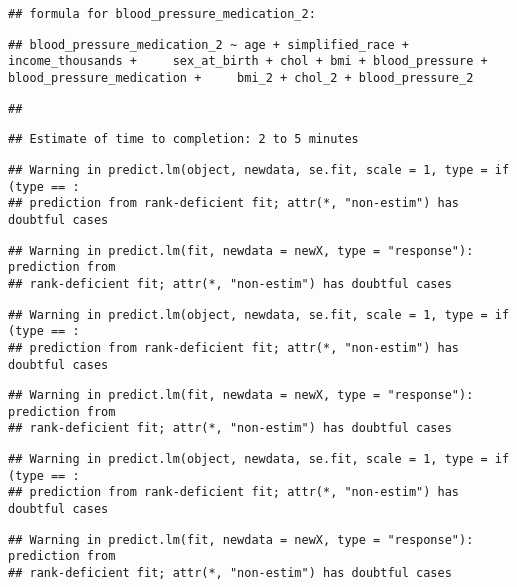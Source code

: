 \documentclass[
]{article}
\begin{document}
\begin{verbatim}
## formula for blood_pressure_medication_2:
\end{verbatim}

\begin{verbatim}
## blood_pressure_medication_2 ~ age + simplified_race + income_thousands +     sex_at_birth + chol + bmi + blood_pressure + blood_pressure_medication +     bmi_2 + chol_2 + blood_pressure_2
\end{verbatim}

\begin{verbatim}
## 
\end{verbatim}

\begin{verbatim}
## Estimate of time to completion: 2 to 5 minutes
\end{verbatim}

\begin{verbatim}
## Warning in predict.lm(object, newdata, se.fit, scale = 1, type = if (type == :
## prediction from rank-deficient fit; attr(*, "non-estim") has doubtful cases
\end{verbatim}

\begin{verbatim}
## Warning in predict.lm(fit, newdata = newX, type = "response"): prediction from
## rank-deficient fit; attr(*, "non-estim") has doubtful cases
\end{verbatim}

\begin{verbatim}
## Warning in predict.lm(object, newdata, se.fit, scale = 1, type = if (type == :
## prediction from rank-deficient fit; attr(*, "non-estim") has doubtful cases
\end{verbatim}

\begin{verbatim}
## Warning in predict.lm(fit, newdata = newX, type = "response"): prediction from
## rank-deficient fit; attr(*, "non-estim") has doubtful cases
\end{verbatim}

\begin{verbatim}
## Warning in predict.lm(object, newdata, se.fit, scale = 1, type = if (type == :
## prediction from rank-deficient fit; attr(*, "non-estim") has doubtful cases
\end{verbatim}

\begin{verbatim}
## Warning in predict.lm(fit, newdata = newX, type = "response"): prediction from
## rank-deficient fit; attr(*, "non-estim") has doubtful cases
\end{verbatim}
\end{document}

